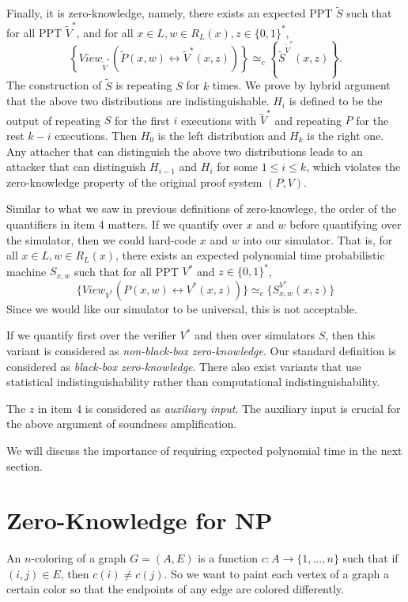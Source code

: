 \documentclass[12pt]{tufte-book}
\begin{document}
Finally, it  is zero-knowledge, namely, there exists an expected PPT $\tilde S$ such that for all PPT $\tilde V^*$, and for all $x \in L, w \in R_L (x), z \in \{ 0, 1 \}^*$,
$$\left\{ View_{\tilde V^*} (\tilde P(x,w) \leftrightarrow \tilde V^* (x,z)) \right\} \simeq_c \left\{ \tilde S^{\tilde V^*} (x,z) \right\}.$$
The construction of $\tilde S$ is repeating $S$ for $k$ times. We prove by hybrid argument that the above two distributions are indistinguishable. $H_i$ is defined to be the output of repeating $S$ for the first $i$ executions with $\tilde V^*$ and repeating $P$ for the rest $k-i$ executions. Then $H_0$ is the left distribution and $H_k$ is the right one. Any attacher that can distinguish the above two distributions leads to an attacker that can distinguish $H_{i-1}$ and $H_{i}$ for some $1\leq i \leq k$, which violates the zero-knowledge property of the original proof system $(P,V)$.

Similar to what we saw in previous definitions of zero-knowlege, the order of the quantifiers in item 4 matters.
If we quantify over $x$ and $w$ before quantifying over the simulator,
then we could hard-code  $x$ and $w$ into our simulator. That is, for all $x \in L, w \in R_L (x)$, there exists an expected polynomial time probabilistic machine $S_{x,w}$ such that for all PPT $V^*$ and $z \in \{ 0, 1 \}^*$,
$$\{ View_{V^*} (P(x,w) \leftrightarrow V^* (x,z)) \} \simeq_c \{ S_{x,w}^{V^*} (x,z) \} $$
Since we would like our simulator to be universal,  this is not acceptable.

If we quantify first over the verifier $V^*$ and then over simulators $S$, then this variant is considered as \emph{non-black-box zero-knowledge}. Our standard definition is considered as \emph{black-box zero-knowledge}. There  also exist variants that use statistical indistinguishability rather than computational indistinguishability.

The $z$ in item 4 is considered as \emph{auxiliary input}. The auxiliary input is crucial for the above argument of soundness amplification.

We will discuss the importance of requiring expected polynomial time in the next section. \bigskip


 

\section{Zero-Knowledge for NP}

An $n$-coloring of a graph $G = (A, E)$ is a function $c: A \to \{1, \ldots, n \}$ such that if $(i, j) \in E$, then $c(i) \neq c(j)$. So we want to paint each vertex of a graph a certain color so that the endpoints of any edge are colored differently.
\end{document}
